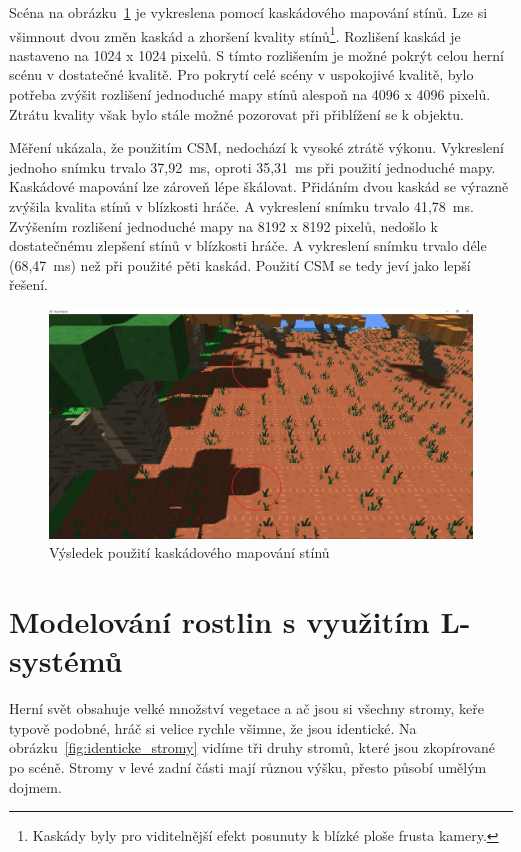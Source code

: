 \documentclass[thesis=M,czech]{FITthesis}[2019/12/23]
\begin{document}
Scéna na obrázku~\ref{fig:shadows_csm} je vykreslena pomocí kaskádového mapování stínů. Lze si všimnout dvou změn kaskád a zhoršení kvality stínů\footnote{Kaskády byly pro viditelnější efekt posunuty k blízké ploše frusta kamery.}. Rozlišení kaskád je nastaveno na 1024 x 1024 pixelů. S tímto rozlišením je možné pokrýt celou herní scénu v dostatečné kvalitě. Pro pokrytí celé scény v uspokojivé kvalitě, bylo potřeba zvýšit rozlišení jednoduché mapy stínů alespoň na 4096 x 4096 pixelů. Ztrátu kvality však bylo stále možné pozorovat při přiblížení se k objektu.

Měření ukázala, že použitím CSM, nedochází k vysoké ztrátě výkonu. Vykreslení jednoho snímku trvalo 37,92~ms, oproti 35,31~ms při použití jednoduché mapy. Kaskádové mapování lze zároveň lépe škálovat. Přidáním dvou kaskád se výrazně zvýšila kvalita stínů v blízkosti hráče. A vykreslení snímku trvalo 41,78~ms. Zvýšením rozlišení jednoduché mapy na 8192 x 8192 pixelů, nedošlo k dostatečnému zlepšení stínů v blízkosti hráče. A vykreslení snímku trvalo déle (68,47~ms) než při použité pěti kaskád. Použití CSM se tedy jeví jako lepší řešení.

\begin{figure}\centering
	\includegraphics[width=\textwidth]{images/shadows/csm}
	\caption[Výsledek použití kaskádového mapování stínů]{Výsledek použití kaskádového mapování stínů}\label{fig:shadows_csm}
\end{figure}





\chapter{Modelování rostlin s využitím L-systémů}
Herní svět obsahuje velké množství vegetace a ač jsou si všechny stromy, keře typově podobné, hráč si velice rychle všimne, že jsou identické. Na obrázku~\ref{fig:identicke_stromy} vidíme tři druhy stromů, které jsou zkopírované po scéně. Stromy v levé zadní části mají různou výšku, přesto působí umělým dojmem.
\end{document}
